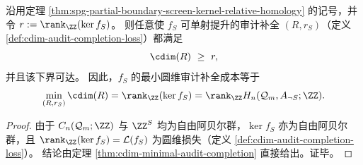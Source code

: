 \begin{corollary}[最小审计补全成本等于屏幕核秩]\label{cor:spg-partial-boundary-min-audit-cost-kernel-rank}
沿用定理 \ref{thm:spg-partial-boundary-screen-kernel-relative-homology} 的记号，并令 \(r:=\rank_{\ZZ}(\ker f_S)\)。
则任意使 \(f_S\) 可单射提升的审计补全 \((R,r_S)\)（定义 \ref{def:cdim-audit-completion-loss}）都满足
\[
\cdim(R)\ \ge\ r,
\]
并且该下界可达。
因此，\(f_S\) 的最小圆维审计补全成本等于
\[
\min_{(R,r_S)}\cdim(R)=\rank_{\ZZ}(\ker f_S)=\rank_{\ZZ}H_n(\mathcal Q_m,A_{\neg S};\ZZ).
\]
\end{corollary}
\begin{proof}
由于 \(C_n(\mathcal Q_m;\ZZ)\) 与 \(\ZZ^{S}\) 均为自由阿贝尔群，\(\ker f_S\) 亦为自由阿贝尔群，且
\(
\rank_{\ZZ}(\ker f_S)=\mathcal L(f_S)
\)
为圆维损失（定义 \ref{def:cdim-audit-completion-loss}）。
结论由定理 \ref{thm:cdim-minimal-audit-completion} 直接给出。证毕。
\end{proof}

